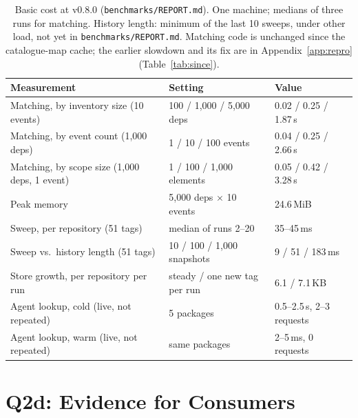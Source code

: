\documentclass[11pt,a4paper]{article}
\newcommand{\code}[1]{\texttt{#1}}
\newcommand{\release}{v0.8.0}
\begin{document}
\begin{table}[t]
\centering
\footnotesize
\begin{tabularx}{\linewidth}{@{}>{\raggedright\arraybackslash}X l l@{}}
\toprule
Measurement & Setting & Value \\
\midrule
Matching, by inventory size (10 events) & 100 / 1{,}000 / 5{,}000 deps & 0.02 / 0.25 / 1.87\,s \\
Matching, by event count (1{,}000 deps) & 1 / 10 / 100 events & 0.04 / 0.25 / 2.66\,s \\
Matching, by scope size (1{,}000 deps, 1 event) & 1 / 100 / 1{,}000 elements & 0.05 / 0.42 / 3.28\,s \\
Peak memory & 5{,}000 deps $\times$ 10 events & 24.6\,MiB \\
Sweep, per repository (51 tags) & median of runs 2--20 & 35--45\,ms \\
Sweep vs.\ history length (51 tags) & 10 / 100 / 1{,}000 snapshots & 9 / 51 / 183\,ms \\
Store growth, per repository per run & steady / one new tag per run & 6.1 / 7.1\,KB \\
Agent lookup, cold (live, not repeated) & 5 packages & 0.5--2.5\,s, 2--3 requests \\
Agent lookup, warm (live, not repeated) & same packages & 2--5\,ms, 0 requests \\
\bottomrule
\end{tabularx}
\caption{Basic cost at \release{} (\code{benchmarks/REPORT.md}). One
machine; medians of three runs for matching. History length: minimum
of the last 10 sweeps, under other load, not yet in
\code{benchmarks/REPORT.md}. Matching
code is unchanged since the catalogue-map cache; the earlier slowdown
and its fix are in Appendix~\ref{app:repro} (Table~\ref{tab:since}).}
\label{tab:cost}
\end{table}

\section{Q2d: Evidence for Consumers}
\label{sec:consumers}
\end{document}
